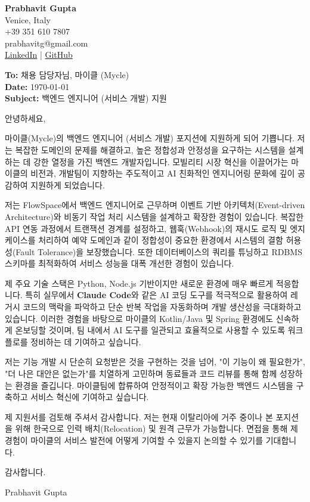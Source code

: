 \documentclass[11pt,a4paper]{article}
\begin{document}
\begin{flushright}
\textbf{Prabhavit Gupta}\\
Venice, Italy\\
+39 351 610 7807\\
prabhavitg@gmail.com\\
\href{https://www.linkedin.com/in/prabhavit/}{LinkedIn} | \href{https://github.com/prab-gupta}{GitHub}
\end{flushright}

\vspace{2em}

\textbf{To:} 채용 담당자님, 마이클 (Mycle)\\
\textbf{Date:} \today\\
\textbf{Subject:} 백엔드 엔지니어 (서비스 개발) 지원

\vspace{1em}

안녕하세요,

마이클(Mycle)의 백엔드 엔지니어 (서비스 개발) 포지션에 지원하게 되어 기쁩니다. 저는 복잡한 도메인의 문제를 해결하고, 높은 정합성과 안정성을 요구하는 시스템을 설계하는 데 강한 열정을 가진 백엔드 개발자입니다. 모빌리티 시장 혁신을 이끌어가는 마이클의 비전과, 개발팀이 지향하는 주도적이고 AI 친화적인 엔지니어링 문화에 깊이 공감하여 지원하게 되었습니다.

저는 FlowSpace에서 백엔드 엔지니어로 근무하며 이벤트 기반 아키텍처(Event-driven Architecture)와 비동기 작업 처리 시스템을 설계하고 확장한 경험이 있습니다. 복잡한 API 연동 과정에서 트랜잭션 경계를 설정하고, 웹훅(Webhook)의 재시도 로직 및 엣지 케이스를 처리하여 예약 도메인과 같이 정합성이 중요한 환경에서 시스템의 결함 허용성(Fault Tolerance)을 보장했습니다. 또한 데이터베이스의 쿼리를 튜닝하고 RDBMS 스키마를 최적화하여 서비스 성능을 대폭 개선한 경험이 있습니다.

제 주요 기술 스택은 Python, Node.js 기반이지만 새로운 환경에 매우 빠르게 적응합니다. 특히 실무에서 \textbf{Claude Code}와 같은 AI 코딩 도구를 적극적으로 활용하여 레거시 코드의 맥락을 파악하고 단순 반복 작업을 자동화하며 개발 생산성을 극대화하고 있습니다. 이러한 경험을 바탕으로 마이클의 Kotlin/Java 및 Spring 환경에도 신속하게 온보딩할 것이며, 팀 내에서 AI 도구를 일관되고 효율적으로 사용할 수 있도록 워크플로를 정비하는 데 기여하고 싶습니다.

저는 기능 개발 시 단순히 요청받은 것을 구현하는 것을 넘어, "이 기능이 왜 필요한가", "더 나은 대안은 없는가"를 치열하게 고민하며 동료들과 코드 리뷰를 통해 함께 성장하는 환경을 즐깁니다. 마이클팀에 합류하여 안정적이고 확장 가능한 백엔드 시스템을 구축하고 서비스 혁신에 기여하고 싶습니다.

제 지원서를 검토해 주셔서 감사합니다. 저는 현재 이탈리아에 거주 중이나 본 포지션을 위해 한국으로 인력 배치(Relocation) 및 원격 근무가 가능합니다. 면접을 통해 제 경험이 마이클의 서비스 발전에 어떻게 기여할 수 있을지 논의할 수 있기를 기대합니다.

감사합니다.

\vspace{1em}
Prabhavit Gupta
\end{document}
